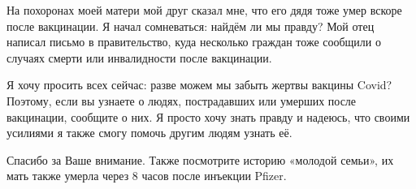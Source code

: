 {На похоронах моей матери мой друг сказал мне, что его дядя тоже умер вскоре
после вакцинации. Я начал сомневаться: найдём ли мы правду? Мой отец написал
письмо в правительство, куда несколько граждан тоже сообщили о случаях смерти
или инвалидности после вакцинации.

Я хочу просить всех сейчас: разве можем мы забыть жертвы вакцины Covid?
Поэтому, если вы узнаете о людях, пострадавших или умерших после вакцинации,
сообщите о них.  Я просто хочу знать правду и надеюсь, что своими усилиями я
также смогу помочь другим людям узнать её.

Спасибо за Ваше внимание. Также посмотрите историю «молодой семьи», их мать
также умерла через 8 часов после инъекции Pfizer.

}
          
          
